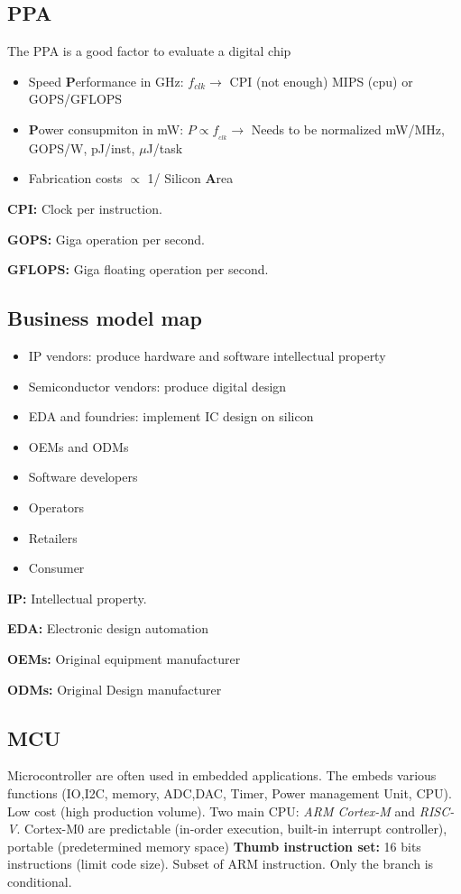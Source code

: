 \subsection{PPA}
The PPA is a good factor to evaluate a digital chip
\begin{itemize}
  \item Speed \textbf{P}erformance in GHz:
    \subitem \(f_{clk} \rightarrow\) CPI (not enough)
    \subitem MIPS (cpu) or GOPS/GFLOPS
  \item \textbf{P}ower consupmiton in mW:
    \subitem \(P \propto f_{_{clk}} \rightarrow\) Needs to be normalized
      \subitem mW/MHz, GOPS/W, pJ/inst, \(\mu\)J/task
    \item Fabrication costs \(\propto\) 1/ Silicon \textbf{A}rea
\end{itemize}

\textbf{CPI:} Clock per instruction.

\textbf{GOPS:} Giga operation per second.

\textbf{GFLOPS:} Giga floating operation per second.



\subsection{Business model map}
\begin{itemize}
  \item IP vendors: produce hardware and software intellectual property
  \item Semiconductor vendors: produce digital design
  \item EDA and foundries: implement IC design on silicon
  \item OEMs and ODMs
  \item Software developers
  \item Operators
  \item Retailers
  \item Consumer
\end{itemize}
\bigbreak
\textbf{IP:} Intellectual property.

\textbf{EDA:} Electronic design automation

\textbf{OEMs:} Original equipment manufacturer

\textbf{ODMs:} Original Design manufacturer



\subsection{MCU}
Microcontroller are often used in embedded applications. The embeds various functions (IO,I2C, memory, ADC,DAC, Timer, Power management Unit, CPU). Low cost (high production volume).
\bigbreak
Two main CPU: \textit{ARM Cortex-M} and \textit{RISC-V}. Cortex-M0 are predictable (in-order execution, built-in interrupt controller), portable (predetermined memory space)
\bigbreak
\textbf{Thumb instruction set:} 16 bits instructions (limit code size). Subset of ARM instruction. Only the branch is conditional.
\bigbreak
